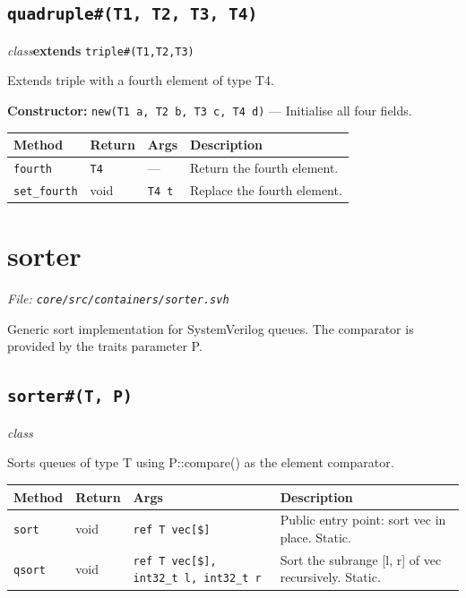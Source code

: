 \documentclass[11pt,letterpaper]{report}
\begin{document}
\subsection*{\texttt{quadruple\#(T1, T2, T3, T4)}}
\noindent\small\textit{class}\quad \textbf{extends} \texttt{triple\#(T1,T2,T3)}\par

Extends triple with a fourth element of type T4.

\noindent\textbf{Constructor:} \texttt{new(T1 a, T2 b, T3 c, T4 d)} --- Initialise all four fields.

\begin{xltabular}{\linewidth}{>{\small}p{1.35in} >{\small}p{1.25in} >{\small}p{0.95in} >{\small}X}
\toprule
\textbf{Method} & \textbf{Return} & \textbf{Args} & \textbf{Description} \\
\midrule
\endhead
\bottomrule
\endfoot
\texttt{fourth} & \texttt{T4} & --- & Return the fourth element. \\
\texttt{set\_fourth} & void & \texttt{T4 t} & Replace the fourth element. \\
\end{xltabular}

\section{sorter}
\noindent\small\textit{File: \texttt{core/src/containers/sorter.svh}}\par

Generic sort implementation for SystemVerilog queues. The comparator is provided by the traits parameter P.

\subsection*{\texttt{sorter\#(T, P)}}
\noindent\small\textit{class}\par

Sorts queues of type T using P::compare() as the element comparator.

\begin{xltabular}{\linewidth}{>{\small}p{1.35in} >{\small}p{1.25in} >{\small}p{0.95in} >{\small}X}
\toprule
\textbf{Method} & \textbf{Return} & \textbf{Args} & \textbf{Description} \\
\midrule
\endhead
\bottomrule
\endfoot
\texttt{sort} & void & \texttt{ref T vec[\$]} & Public entry point: sort vec in place. Static. \\
\texttt{qsort} & void & \texttt{ref T vec[\$], int32\_t l, int32\_t r} & Sort the subrange [l, r] of vec recursively. Static. \\
\end{xltabular}
\end{document}
